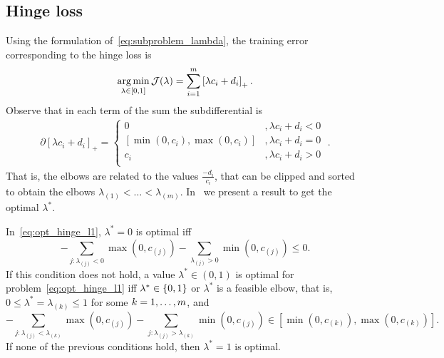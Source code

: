 \subsection{Hinge loss}
Using the formulation of~\eqref{eq:subproblem_lambda}, the training error corresponding to the hinge loss is
\begin{equation}
    \label{eq:opt_hinge_l1}
    \argmin_{\lambda \in [0, 1]} \mathcal{J}(\lambda) = \sum_{i=1}^{\npertask} \pospart{\lambda c_i + d_i}.
\end{equation}
Observe that in each term of the sum the subdifferential is 
\begin{align*}
    \partial \left[\lambda c_i + d_i \right]_+ = 
    \begin{cases}
        0 &, \lambda c_i + d_i  < 0 \\
        [\min(0, c_i), \max(0, c_i)] &, \lambda c_i + d_i  = 0 \\
        c_i &, \lambda c_i + d_i  > 0 \\
    \end{cases} \; .
\end{align*}
That is, the elbows are related to the values $\frac{-d_i}{c_i}$, that can be clipped and sorted to obtain the elbows ${\lambda}_{(1)} < \ldots < {\lambda}_{(m)}$.
In~\citet[Proposition 2]{RuizAD21} we present a result to get the optimal $\lambda^*$.
\begin{prop}\label{prop:hinge_neurocom2020}
    In~\eqref{eq:opt_hinge_l1}, $\lambda^*=0$ is optimal iff
    \begin{equation}\label{eq:sol_hinge_0}
        -\sum_{j: \lambda_{(j)}<0} \max(0, c_{(j)}) - \sum_{\lambda_{(j)}>0} \min(0, c_{(j)}) \leq 0 .
        \end{equation}
        If this condition does not hold, a value $\lambda^* \in (0, 1)$ is optimal for problem~\eqref{eq:opt_hinge_l1} iff $\lambda^* \in \left\{0, 1\right\}$ or $\lambda^*$ is a feasible elbow, that is, $0 \leq \lambda^* = \lambda_{(k)} \leq 1$ for some $k=1, \dotsc, m$, and
    \begin{equation}\label{eq:sol_hinge}
        -\sum_{j: \lambda_{(j)}< \lambda_{(k)}} \max(0, c_{(j)}) - \sum_{j: \lambda_{(j)}>  \lambda_{(k)}} \min(0, c_{(j)}) \in \left[\min(0, c_{(k)}), \max(0, c_{(k)}) \right] .
    \end{equation}
    If none of the previous conditions hold, then $\lambda^*=1$ is optimal.
\end{prop}


